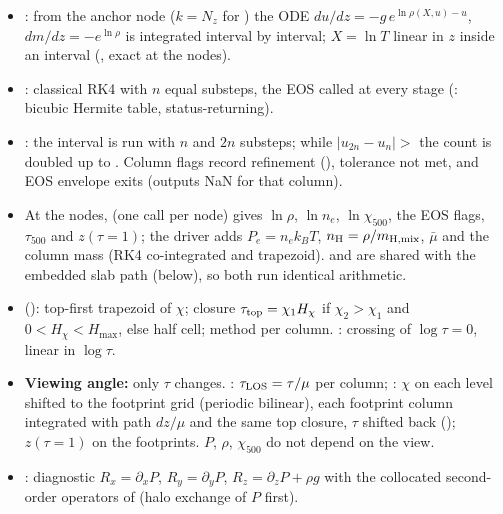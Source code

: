 \begin{itemize}
\item {}: from the anchor node ($k=N_z$ for ) the ODE $du/dz=-g\,e^{\ln\rho(X,u)-u}$,
$dm/dz=-e^{\ln\rho}$ is integrated interval by interval; $X=\ln T$ linear in $z$ inside an interval (, exact at
the nodes).
\item {}: classical RK4 with $n$ equal substeps, the EOS called at every stage (: bicubic Hermite
table, status-returning).
\item {}: the interval is run with $n$ and $2n$ substeps; while $|u_{2n}-u_n|>$  the
count is doubled up to . Column flags record refinement (), tolerance not met,
and EOS envelope exits (outputs NaN for that column).
\item At the nodes,  (one  call per node) gives $\ln\rho$, $\ln n_e$, $\ln\chi_{500}$,
the EOS flags, $\tau_{500}$ and $z(\tau{=}1)$; the driver adds $P_e=n_ek_BT$, $n_{\rm H}=\rho/m_{\rm H,mix}$, $\bar\mu$ and
the column mass (RK4 co-integrated and trapezoid).  and  are shared with the
embedded slab path (below), so both run identical arithmetic.
\item {} (): top-first trapezoid of $\chi$;  closure
$\tau_{\rm top}=\chi_1H_\chi$ if $\chi_2>\chi_1$ and $0<H_\chi<H_{\max}$, else half cell; method per column.
: crossing of $\log\tau=0$, linear in $\log\tau$.
\item \textbf{Viewing angle:} only $\tau$ changes. : $\tau_{\rm LOS}=\tau/\mu$ per column;
: $\chi$ on each level shifted to the footprint grid (periodic bilinear), each footprint column integrated with path
$dz/\mu$ and the same top closure, $\tau$ shifted back (); $z(\tau{=}1)$ on the footprints. $P$, $\rho$,
$\chi_{500}$ do not depend on the view.
\item {}: diagnostic $R_x=\partial_xP$, $R_y=\partial_yP$, $R_z=\partial_zP+\rho g$ with the
collocated second-order operators of  (halo exchange of $P$ first).
\end{itemize}

